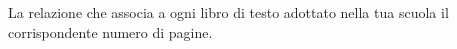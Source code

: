 La relazione che associa a ogni libro di testo adottato nella tua scuola il corrispondente numero di pagine.